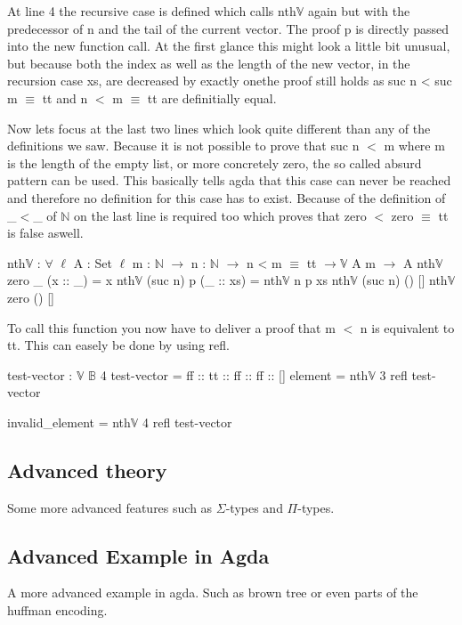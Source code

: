 At line 4 the recursive case is defined which calls nth$\mathbb{V}$ again but with the predecessor of n and the tail of the current vector.
The proof p is directly passed into the new function call. At the first glance this might look a little bit unusual, but because both the index as well as the length of the new vector, in the recursion case xs, 
are decreased by exactly onethe proof still holds as suc n < suc m $\equiv$ tt and n $<$ m $\equiv$ tt are definitially equal.

Now lets focus at the last two lines which look quite different than any of the definitions we saw.
Because it is not possible to prove that suc n $<$ m where m is the length of the empty list, or more concretely zero, the so called absurd pattern can be used. This basically tells agda that this case can never be reached and therefore no definition for this case has to exist.
Because of the definition of \_$<$\_ of $\mathbb{N}$ on the last line is required too which proves that zero $<$ zero $\equiv$ tt is false aswell.  

\begin{codesnippet}[mathescape=true, caption={Definition of nth function in Agda}, label={codeSnippet:vector_nth}]
nth$\mathbb{V}$ : $\forall$ {$\ell$} {A : Set $\ell$} {m : $\mathbb{N}$} $\rightarrow$
       n : $\mathbb{N}$ $\rightarrow$ n < m $\equiv$ tt $\rightarrow \mathbb{V}$ A m $\rightarrow$ A
nth$\mathbb{V}$ zero _ (x :: _) = x
nth$\mathbb{V}$ (suc n) p (_ :: xs) = nth$\mathbb{V}$ n p xs
nth$\mathbb{V}$ (suc n) () []
nth$\mathbb{V}$ zero () []
\end{codesnippet}

To call this function you now have to deliver a proof that m $<$ n is equivalent to tt. This can easely be done by using refl.
\begin{codesnippet}[mathescape=true, caption={Definition of nth function in Agda}, label={codeSnippet:vector_nth}]
test-vector : $\mathbb{V}$ $\mathbb{B}$ 4
test-vector = ff :: tt :: ff :: ff :: []
element = nth$\mathbb{V}$ 3 refl test-vector

invalid_element = nth$\mathbb{V}$ 4 refl test-vector
\end{codesnippet}


\subsection{Advanced theory}
Some more advanced features such as $\Sigma$-types and $\Pi$-types.

\subsection{Advanced Example in Agda}
A more advanced example in agda. Such as brown tree or even parts of the huffman encoding.